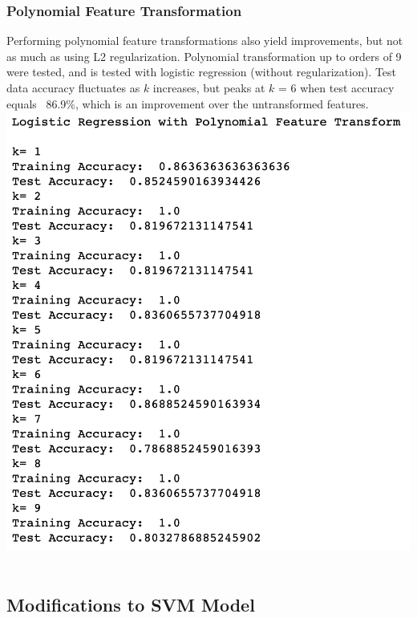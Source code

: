 \documentclass[11pt, oneside]{article}
\begin{document}
\subsubsection *{Polynomial Feature Transformation}
Performing polynomial feature transformations also yield improvements, but not as much as using L2 regularization. Polynomial transformation up to orders of 9 were tested, and is tested with logistic regression (without regularization). Test data accuracy fluctuates as $k$ increases, but peaks at $k$ = 6 when test accuracy equals ~86.9\%, which is an improvement over the untransformed features.\\
\includegraphics{3}\\\\
\subsection *{Modifications to SVM Model}
\end{document}
